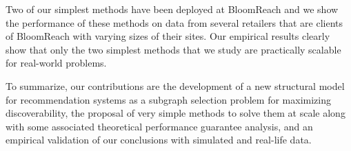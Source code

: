 Two of our simplest methods have been deployed at BloomReach and we show the performance of these methods on data from several retailers that are clients of BloomReach with varying sizes of their sites. Our empirical results clearly show that only the two simplest methods that we study are practically scalable for real-world problems.

To summarize, our contributions are the development of a new structural model for recommendation systems as a subgraph selection problem for maximizing discoverability, the proposal of very simple methods to solve them at scale along with some associated theoretical performance guarantee analysis, and an empirical validation of our conclusions with simulated and real-life data.

